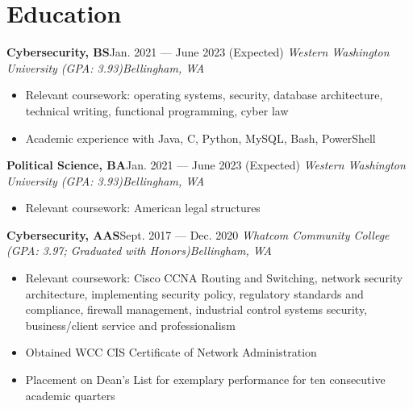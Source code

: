 \documentclass{article}
\newcommand{\topLevelItem}[4]{
    \textbf{#1}\hfill #4\newline
    \emph{#2\hfill #3}\newline
    \vspace{-18pt}\begin{itemize}
}
\newcommand{\topLevelItemEnd}{\end{itemize}\vspace{5pt}}
\newcommand{\lowLevelItem}[1]{
    \item\small{#1}\vspace{-8pt}
}
\begin{document}
    \section*{Education}
        \topLevelItem{Cybersecurity, BS}{Western Washington University (GPA: 3.93)}{Bellingham, WA}{Jan. 2021 — June 2023 (Expected)}
            \lowLevelItem{Relevant coursework: operating systems, security, database architecture, technical writing, functional programming, cyber law}
            \lowLevelItem{Academic experience with Java, C, Python, MySQL, Bash, PowerShell}
        \topLevelItemEnd
        \topLevelItem{Political Science, BA}{Western Washington University (GPA: 3.93)}{Bellingham, WA}{Jan. 2021 — June 2023 (Expected)}
            \lowLevelItem{Relevant coursework: American legal structures}
        \topLevelItemEnd
        \topLevelItem{Cybersecurity, AAS}{Whatcom Community College (GPA: 3.97; Graduated with Honors)}{Bellingham, WA}{Sept. 2017 — Dec. 2020}
            \lowLevelItem{Relevant coursework: Cisco CCNA Routing and Switching, network security architecture, implementing security policy, regulatory standards and compliance, firewall management, industrial control systems security, business/client service and professionalism}
            \lowLevelItem{Obtained WCC CIS Certificate of Network Administration}
            \lowLevelItem{Placement on Dean’s List for exemplary performance for ten consecutive academic quarters}
        \topLevelItemEnd
        
\end{document}
